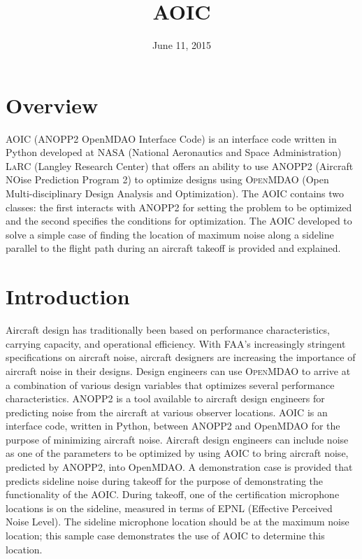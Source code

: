 \documentclass[letterpaper,10pt,english]{sphinxmanual}
\title{AOIC}
\date{June 11, 2015}
\author{}
\begin{document}
\maketitle
\tableofcontents
{}\label{index::doc}



\chapter{Overview}
\label{overview:overview}\label{overview::doc}\label{overview:aoic-documentation}
\textsc{AOIC} (ANOPP2 OpenMDAO Interface Code) is an interface code written in Python developed at \textsc{NASA} (National Aeronautics and Space Administration) \textsc{LaRC} (Langley Research Center) that offers an ability to use \textsc{ANOPP2} (Aircraft NOise Prediction Program 2) to optimize designs using \textsc{OpenMDAO} (Open Multi-disciplinary Design Analysis and Optimization).
The AOIC contains two classes: the first interacts with ANOPP2 for setting the problem to be optimized and the second specifies the conditions for optimization.
The AOIC developed to solve a simple case of finding the location of maximum noise along a sideline parallel to the flight path during an aircraft takeoff is provided and explained.


\chapter{Introduction}
\label{introduction:introduction}\label{introduction::doc}\label{introduction:index-3}
Aircraft design has traditionally been based on performance characteristics, carrying capacity, and operational efficiency.
With FAA's increasingly stringent specifications on aircraft noise, aircraft designers are increasing the importance of aircraft noise in their designs.
Design engineers can use \textsc{OpenMDAO} to arrive at a combination of various design variables that optimizes several performance characteristics.
\textsc{ANOPP2} is a tool available to aircraft design engineers for predicting noise from the aircraft at various observer locations.
\textsc{AOIC} is an interface code, written in Python, between ANOPP2 and OpenMDAO for the purpose of minimizing aircraft noise.
Aircraft design engineers can include noise as one of the parameters to be optimized by using AOIC to bring aircraft noise, predicted by ANOPP2, into OpenMDAO.
A demonstration case is provided that predicts sideline noise during takeoff for the purpose of demonstrating the functionality of the AOIC.
During takeoff, one of the certification microphone locations is on the sideline, measured in terms of \textsc{EPNL} (Effective Perceived Noise Level).
The sideline microphone location should be at the maximum noise location; this sample case demonstrates the use of AOIC to determine this location.
\end{document}
